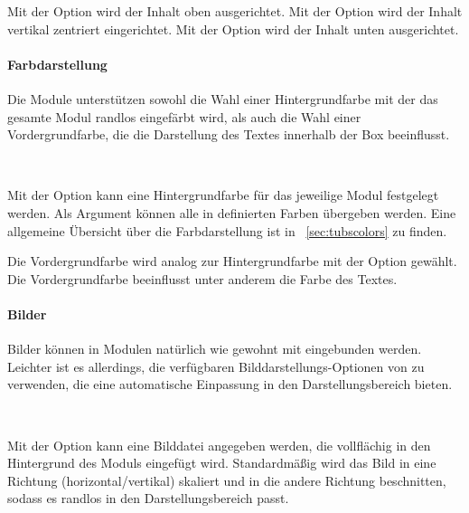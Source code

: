 Mit der Option  wird der Inhalt oben ausgerichtet.
Mit der Option  wird der Inhalt vertikal zentriert eingerichtet.
Mit der Option  wird der Inhalt unten ausgerichtet.

\paragraph{Farbdarstellung}\hfill

Die Module unterstützen sowohl die Wahl einer Hintergrundfarbe mit der das
gesamte Modul randlos eingefärbt wird, als auch die Wahl einer
Vordergrundfarbe, die die Darstellung des Textes innerhalb der Box beeinflusst.

\begin{Declaration}
  \\
\end{Declaration}

Mit der Option  kann eine Hintergrundfarbe für das
jeweilige Modul festgelegt werden. Als Argument können alle in \tubslatex
definierten Farben übergeben werden.
Eine allgemeine Übersicht über die Farbdarstellung ist in
\chaptername~\ref{sec:tubscolors} zu finden.

Die Vordergrundfarbe wird analog zur Hintergrundfarbe mit der
Option  gewählt.
Die Vordergrundfarbe beeinflusst unter anderem die Farbe des Textes.

\paragraph{Bilder}\hfill

Bilder können in Modulen natürlich wie gewohnt mit 
eingebunden werden.
Leichter ist es allerdings, die verfügbaren Bilddarstellungs-Optionen
von \tubslatex zu verwenden, die eine automatische Einpassung in den
Darstellungsbereich bieten.

\begin{Declaration}
  \\
\end{Declaration}

Mit der Option  kann eine Bilddatei angegeben werden,
die vollflächig in den Hintergrund des Moduls eingefügt wird.
Standardmäßig wird das Bild in eine Richtung (horizontal/vertikal) skaliert
und in die andere Richtung beschnitten,
sodass es randlos in den Darstellungsbereich passt.

